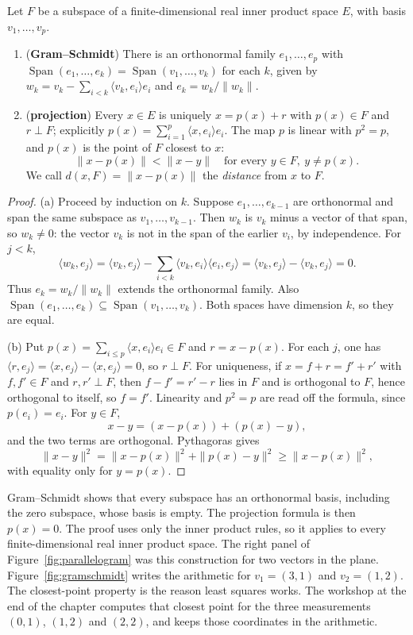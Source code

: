 \begin{theorem}\label{thm:gramschmidt}
Let $F$ be a subspace of a finite-dimensional real inner product space $E$, with basis $v_1,\dots,v_p$.
\begin{enumerate}[label=(\alph*)]
\item (\textbf{Gram--Schmidt}) There is an orthonormal family $e_1,\dots,e_p$ with $\operatorname{Span}(e_1,\dots,e_k)=\operatorname{Span}(v_1,\dots,v_k)$ for each $k$, given by $w_k=v_k-\sum_{i<k}\langle v_k,e_i\rangle e_i$ and $e_k=w_k/\|w_k\|$.
\item (\textbf{projection}) Every $x\in E$ is uniquely $x=p(x)+r$ with $p(x)\in F$ and $r\perp F$; explicitly $p(x)=\sum_{i=1}^p\langle x,e_i\rangle e_i$. The map $p$ is linear with $p^2=p$, and $p(x)$ is the point of $F$ closest to $x$:
\[
\|x-p(x)\|<\|x-y\|\quad\text{for every }y\in F,\ y\ne p(x).
\]
We call $d(x,F)=\|x-p(x)\|$ the \emph{distance} from $x$ to $F$.
\end{enumerate}
\end{theorem}
\begin{proof}
(a) Proceed by induction on $k$. Suppose $e_1,\dots,e_{k-1}$ are orthonormal and span the same subspace as $v_1,\dots,v_{k-1}$. Then $w_k$ is $v_k$ minus a vector of that span, so $w_k\ne0$: the vector $v_k$ is not in the span of the earlier $v_i$, by independence. For $j<k$,
\[
\langle w_k,e_j\rangle=\langle v_k,e_j\rangle-\sum_{i<k}\langle v_k,e_i\rangle\langle e_i,e_j\rangle=\langle v_k,e_j\rangle-\langle v_k,e_j\rangle=0.
\]
Thus $e_k=w_k/\|w_k\|$ extends the orthonormal family. Also $\operatorname{Span}(e_1,\dots,e_k)\subseteq\operatorname{Span}(v_1,\dots,v_k)$. Both spaces have dimension $k$, so they are equal.

(b) Put $p(x)=\sum_{i\le p}\langle x,e_i\rangle e_i\in F$ and $r=x-p(x)$. For each $j$, one has $\langle r,e_j\rangle=\langle x,e_j\rangle-\langle x,e_j\rangle=0$, so $r\perp F$. For uniqueness, if $x=f+r=f'+r'$ with $f,f'\in F$ and $r,r'\perp F$, then $f-f'=r'-r$ lies in $F$ and is orthogonal to $F$, hence orthogonal to itself, so $f=f'$. Linearity and $p^2=p$ are read off the formula, since $p(e_i)=e_i$. For $y\in F$,
\[
x-y=(x-p(x))+(p(x)-y),
\]
and the two terms are orthogonal. Pythagoras gives
\[
\|x-y\|^2=\|x-p(x)\|^2+\|p(x)-y\|^2\ge\|x-p(x)\|^2,
\]
with equality only for $y=p(x)$.
\end{proof}

Gram--Schmidt shows that every subspace has an orthonormal basis, including the zero subspace, whose basis is empty. The projection formula is then $p(x)=0$. The proof uses only the inner product rules, so it applies to every finite-dimensional real inner product space. The right panel of Figure~\ref{fig:parallelogram} was this construction for two vectors in the plane. Figure~\ref{fig:gramschmidt} writes the arithmetic for $v_1=(3,1)$ and $v_2=(1,2)$. The closest-point property is the reason least squares works. The workshop at the end of the chapter computes that closest point for the three measurements $(0,1)$, $(1,2)$ and $(2,2)$, and keeps those coordinates in the arithmetic.

